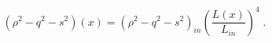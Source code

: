 \begin{equation}
\label{e4:16}
(\rho^2-q^2-s^2){(x)}=(\rho^2-q^2-s^2)_{in}\left(\frac{L(x)}{L_{in}}\right)^4 \; .
\end{equation}

